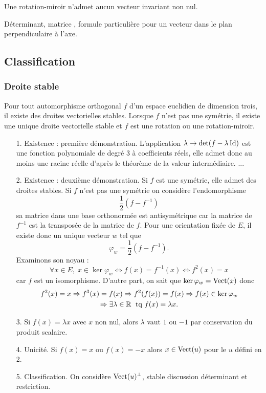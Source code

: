 Une rotation-miroir n'admet aucun vecteur invariant non nul.

Déterminant, matrice , formule particulière pour un vecteur dans le plan perpendiculaire à l'axe.
\clearpage
\subsection{Classification}
\subsubsection{Droite stable}
\begin{propn}
 Pour tout automorphisme orthogonal $f$ d'un espace euclidien de dimension trois, il existe des droites vectorielles stables. Lorsque $f$ n'est pas une symétrie, il existe une unique droite vectorielle stable et $f$ est une rotation ou une rotation-miroir.
\end{propn}
\begin{demo}
 \begin{itemize}
 \item[1. Existence : première démonstration.] L'application $\lambda \rightarrow \det(f-\lambda \mathop{\mathrm{Id}})$ est une fonction polynomiale de degré $3$ à coefficients réels, elle admet donc au moins une racine réelle d'après le théorème de la valeur intermédiaire. ...
\item [2. Existence : deuxième démonstration.]
Si $f$ est une symétrie, elle admet des droites stables.\newline
Si $f$ n'est pas une symétrie on considère l'endomorphisme
\begin{displaymath}
 \frac{1}{2}\left( f - f^{-1}\right) 
\end{displaymath}
sa matrice dans une base orthonormée est antisymétrique car la matrice de $f^{-1}$ est la transposée de la matrice de $f$. Pour une orientation fixée de $E$, il existe donc un unique vecteur $w$ tel que
\begin{displaymath}
 \varphi_w = \frac{1}{2}\left( f - f^{-1}\right) .
\end{displaymath}
Examinons son noyau :
\[
\forall x \in E, \; x \in \ker \varphi_w \Leftrightarrow f(x) = f^{-1}(x) \Leftrightarrow f^2(x) = x
\]
car $f$ est un isomorphisme. D'autre part, on sait que $\ker \varphi_w = \mathop{\mathrm{Vect}}(x)$ donc
\begin{multline*}
 f^2(x) = x \Rightarrow f^3(x) = f(x) \Rightarrow f^2(f(x)) = f(x) \Rightarrow f(x) \in \ker \varphi_w\\
 \Rightarrow \exists \lambda\in \mathbb{R}\;\text{ tq } f(x) = \lambda x.
\end{multline*}
\item [3.] Si $f(x)=\lambda x$ avec $x$ non nul, alors $\lambda$ vaut $1$ ou $-1$ par conservation du produit scalaire.
\item [4. Unicité.] Si $f(x)=x$ ou $f(x)=-x$ alors $x\in \mathop{\mathrm{Vect}}(u)$ pour le $u$ défini en 2.
\item [5. Classification.] On considère $\mathop{\mathrm{Vect}}(u)^\bot$, stable discussion déterminant et restriction.
\end{itemize}
\end{demo}
\clearpage
